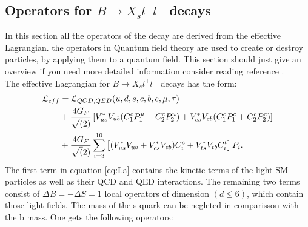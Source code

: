 \documentclass[english]{uzhpub}
\begin{document}
\subsection{Operators for $B \rightarrow X_s l^+l^-$ decays}
In this section all the operators of the decay are derived from the effective Lagrangian. the operators in Quantum field theory are used to create or destroy particles, by applying them to a quantum field. This section should just give an overview if you need more detailed information consider reading reference \cite{bib:Operators}. \\
The effective Lagrangian for $B \rightarrow X_s l^+l^-$ decays has the form:
\begin{align}
 \mathcal{L}_{eff} & = \mathcal{L}_{QCD,QED}(u,d,s,c,b,e,\mu,\tau) \notag                                                                                           \\
                   & + \frac{4G_F}{\sqrt(2)} \left[ V_{us}^* V_{ub} (C_1^c P_1^u + C_2^c P_2^u) + V_{cs}^* V_{cb} (C_1^c P_1^c + C_2^c P_2^c) \right] \label{eq:La} \\
                   & + \frac{4G_F}{\sqrt(2)} \sum_{i=3}^{10} \left[ (V_{us}^* V_{ub} + V_{cs}^* V_{cb})C_i^c + V_{ts}^* V_{tb} C_i^t  \right]P_i . \notag
\end{align}
The first term in equation \ref{eq:La} contains the kinetic terms of the light SM particles as well as their QCD and QED interactions. The remaining two terms consist of $\Delta B = - \Delta S =1$ local operators of dimension $(d \leq 6)$, which contain those light fields. The mass of the s quark can be negleted in comparisson with the b mass. One gets the following operators:
\end{document}
